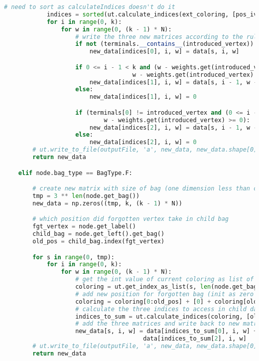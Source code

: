 \begin{svgraybox}
\begin{lstlisting}[language=python]
            # need to sort as calculateIndices doesn't do it
            indices = sorted(ut.calculate_indices(ext_coloring, [pos_iv]))
            for i in range(0, k):
                for w in range(0, (k - 1) * N):
                    # write the three new matrices according to the rules from the paper
                    if not (terminals.__contains__(introduced_vertex)):
                        new_data[indices[0], i, w] = data[s, i, w]

                    if 0 <= i - 1 < k and (w - weights.get(introduced_vertex) >= 0) and (
                                    w - weights.get(introduced_vertex) < (k - 1) * N):
                        new_data[indices[1], i, w] = data[s, i - 1, w - weights.get(introduced_vertex)]
                    else:
                        new_data[indices[1], i, w] = 0

                    if (terminals[0] != introduced_vertex and (0 <= i - 1 < k) and 
                            w - weights.get(introduced_vertex) >= 0):
                        new_data[indices[2], i, w] = data[s, i - 1, w - weights.get(introduced_vertex)]
                    else:
                        new_data[indices[2], i, w] = 0
        # ut.write_to_file(outputFile, 'a', new_data, new_data.shape[0], str(node.bag_type) + str(node.get_bag()))
        return new_data

    elif node.bag_type == BagType.F:

        # create new matrix with size of bag (one dimension less than child)
        tmp = 3 ** len(node.get_bag())
        new_data = np.zeros((tmp, k, (k - 1) * N))

        # which position did forgotten vertex take in child bag
        fgt_vertex = node.get_label()
        child_bag = node.get_left().get_bag()
        old_pos = child_bag.index(fgt_vertex)

        for s in range(0, tmp):
            for i in range(0, k):
                for w in range(0, (k - 1) * N):
                    # get the int value of current coloring as list of ternary values
                    coloring = ut.get_index_as_list(s, len(node.get_bag()))
                    # add new position for forgotten bag (init as zero because calculateIndices requests that)
                    coloring = coloring[0:old_pos] + [0] + coloring[old_pos:]
                    # calculate the three indices to access in child data matrix
                    indices_to_sum = ut.calculate_indices(coloring, [old_pos])
                    # add the three matrices and write back to new matrix
                    new_data[s, i, w] = data[indices_to_sum[0], i, w] + data[indices_to_sum[1], i, w] +\
                                       data[indices_to_sum[2], i, w]
        # ut.write_to_file(outputFile, 'a', new_data, new_data.shape[0], str(node.bag_type) + str(node.get_bag()))
        return new_data


\end{lstlisting}
\end{svgraybox}
